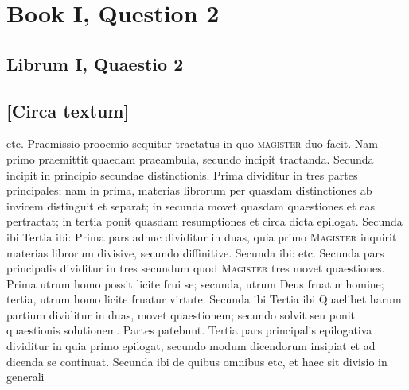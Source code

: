 \documentclass[twoside, openright]{article}
\newcommand{\name}[1]{\textsc{#1}}
\begin{document}
        \chapter*{Book I, Question 2}
        
         
        \beginnumbering
         \section*{Librum I, Quaestio 2} 
        \bigskip
         \section*{[Circa textum]} 
        \pstart
          etc. Praemissio prooemio sequitur tractatus in quo \name{magister} duo facit. Nam primo praemittit quaedam praeambula, secundo incipit tractanda. Secunda incipit in principio secundae distinctionis. Prima dividitur in tres partes principales; nam in prima, materias librorum per quasdam distinctiones ab invicem distinguit et separat; in secunda movet quasdam quaestiones et eas pertractat; in tertia ponit quasdam resumptiones et circa dicta epilogat. Secunda ibi  Tertia ibi:  Prima pars adhuc dividitur in duas, quia primo \name{Magister} inquirit materias librorum divisive, secundo diffinitive. Secunda ibi:  etc. Secunda pars principalis dividitur in tres secundum quod \name{Magister} tres movet quaestiones. Prima utrum homo possit licite frui se; secunda, utrum Deus fruatur homine; tertia, utrum homo licite fruatur virtute. Secunda ibi  Tertia ibi  Quaelibet harum partium dividitur in duas,  movet quaestionem; secundo solvit seu ponit quaestionis solutionem. Partes patebunt. Tertia pars principalis epilogativa dividitur in  quia primo epilogat, secundo modum dicendorum insipiat et ad dicenda se continuat. Secunda ibi de quibus omnibus etc, et haec sit divisio in generali
        \pend
      
\end{document}
